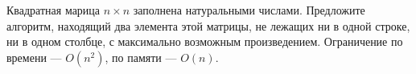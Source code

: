 \documentclass{article}
\begin{document}
Квадратная марица $n\times n$ заполнена натуральными числами. Предложите алгоритм, находящий два элемента этой матрицы, не лежащих 
ни в одной строке, ни в одном столбце, с максимально возможным произведением. Ограничение по времени --- $O(n^2)$, по памяти --- $O(n)$.
\end{document}
